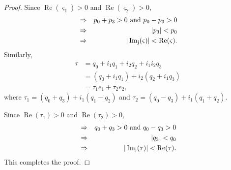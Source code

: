 \documentclass[10pt,a4paper]{amsart}
\begin{document}
\begin{proof}
\noindent Since
$\operatorname{Re}( \varsigma_1)>0$ and  $\operatorname{Re}( \varsigma_2)  >0,$
		\begin{eqnarray}
		&\Rightarrow & p_0+p_3 >0 ~\text{and}~ p_0-p_3 >0 \notag\\
		&	\Rightarrow& ~ |p_3|<p_0 \notag\\
		&\Rightarrow&|\operatorname{Im_j}( \varsigma)|<\operatorname{Re}( \varsigma).\label{eq:re(alpha)g0}
		\end{eqnarray}
		Similarly,	
		\begin{equation}
		\begin{split}
		\tau&= q_0+i_1q_1+ i_2q_2+i_1i_2q_3\\
		&=(q_0+i_1q_1) +i_2( q_2+i_1q_3)\\
		&=\tau_1e_1+\tau_2e_2,
		\end{split}
		\end{equation}
		where $\tau_1= (q_0+q_3) +i_1(q_1-q_2)$ and $\tau_2= (q_0-q_3) +i_1(q_1+q_2).$
		
\noindent 		Since
		$\operatorname{Re}(\tau_1)>0$ and  $\operatorname{Re}(\tau_2)  >0$,
		\begin{eqnarray}
		&\Rightarrow & q_0+q_3 >0 ~\text{and}~ q_0-q_3 >0 \notag\\
		&	\Rightarrow& ~ |q_3|<q_0 \notag \\
		&\Rightarrow&|\operatorname{Im_j}(\tau)|<\operatorname{Re}(\tau). \label{eq:re(alpha)g01}
		\end{eqnarray}
This completes the proof.		
	\end{proof}
\end{document}
